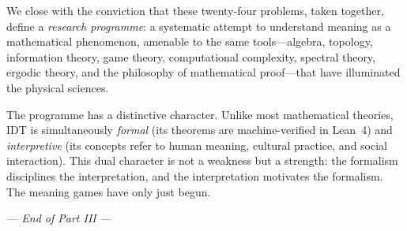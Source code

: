 We close with the conviction that these twenty-four problems, taken together,
define a \emph{research programme}: a systematic attempt to
understand meaning as a mathematical phenomenon, amenable to the
same tools---algebra, topology, information theory, game theory,
computational complexity, spectral theory, ergodic theory, and the
philosophy of mathematical proof---that have illuminated the physical
sciences.

The programme has a distinctive character.  Unlike most mathematical
theories, IDT is simultaneously \emph{formal} (its theorems are
machine-verified in Lean~4) and \emph{interpretive} (its concepts
refer to human meaning, cultural practice, and social interaction).
This dual character is not a weakness but a strength: the formalism
disciplines the interpretation, and the interpretation motivates the
formalism.  The meaning games have only just begun.

\bigskip
\begin{center}
\textit{--- End of Part III ---}
\end{center}

